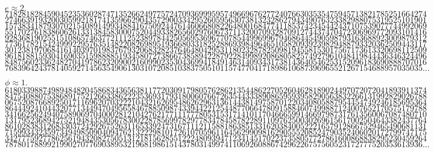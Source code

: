 \documentclass[mathematics_cheat_sheet.tex]{subfiles}
\begin{document}
\vspace{.3\baselineskip}$e\approx2.$\\
$7182818284590452353602874713526624977572470936999595749669676277240766303535475945713821785251664274$\\
$2746639193200305992181741359662904357290033429526059563073813232862794349076323382988075319525101901$\\
$1573834187930702154089149934884167509244761460668082264800168477411853742345442437107539077744992069$\\
$5517027618386062613313845830007520449338265602976067371132007093287091274437470472306969772093101416$\\
$9283681902551510865746377211125238978442505695369677078544996996794686445490598793163688923009879312$\\
$7736178215424999229576351482208269895193668033182528869398496465105820939239829488793320362509443117$\\
$3012381970684161403970198376793206832823764648042953118023287825098194558153017567173613320698112509$\\
$9618188159304169035159888851934580727386673858942287922849989208680582574927961048419844436346324496$\\
$8487560233624827041978623209002160990235304369941849146314093431738143640546253152096183690888707016$\\
$768396424378140592714563549061303107208510383750510115747704171898610687396965521267154688957035035\dots$

\vspace{0.5\baselineskip}$\phi\approx1.$\\
$6180339887498948482045868343656381177203091798057628621354486227052604628189024497072072041893911374$\\
$8475408807538689175212663386222353693179318006076672635443338908659593958290563832266131992829026788$\\
$0675208766892501711696207032221043216269548626296313614438149758701220340805887954454749246185695364$\\
$8644492410443207713449470495658467885098743394422125448770664780915884607499887124007652170575179788$\\
$3416625624940758906970400028121042762177111777805315317141011704666599146697987317613560067087480710$\\
$1317952368942752194843530567830022878569978297783478458782289110976250030269615617002504643382437764$\\
$8610283831268330372429267526311653392473167111211588186385133162038400522216579128667529465490681131$\\
$7159934323597349498509040947621322298101726107059611645629909816290555208524790352406020172799747175$\\
$3427775927786256194320827505131218156285512224809394712341451702237358057727861600868838295230459264$\\
$787801788992199027077690389532196819861514378031499741106926088674296226757560523172777520353613936\dots$
\end{document}
